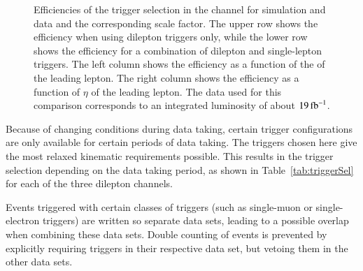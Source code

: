 \begin{figure}[htbp!]
\begin{center}
      \caption{Efficiencies of the trigger selection in the \emu channel for simulation and data and the corresponding scale factor. The upper row shows the efficiency when using dilepton triggers only, while the lower row shows
      the efficiency for a combination of dilepton and single-lepton triggers. The left column shows the efficiency as a function of the \pt of the leading lepton. The right column shows the efficiency as a function of  $\eta$ of the leading lepton. The data used for this comparison corresponds to an integrated luminosity of about $19\mbox{\ensuremath{\,\text{fb}^\text{$-$1}}}$.}  
       \label{fig:TriggerSel}
  \end{center}
\end{figure}


Because of changing conditions during data taking, certain trigger configurations are only available for certain periods of data taking. The triggers chosen here give the most relaxed kinematic requirements possible.
This results in the trigger selection depending on the data taking period, as shown in Table~\ref{tab:triggerSel} for each of the three dilepton channels.

Events triggered with certain classes of triggers (such as single-muon or single-electron triggers) are written so separate data sets, leading
to a possible overlap when combining these data sets.
Double counting of events is prevented by explicitly requiring triggers in their respective data set, but vetoing them in the other data sets.

